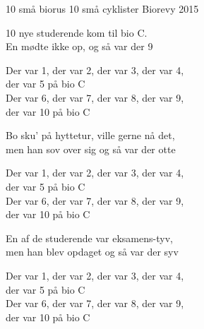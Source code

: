 \begin{song}{10 små biorus}{}
  {10 små cyklister}
  {}
  {Biorevy 2015}
  {\NotCCLIed}

  \begin{SBVerse}
  10 nye studerende kom til bio C.\\
  En mødte ikke op, og så var der 9\\
  \end{SBVerse}

  \begin{SBChorus}
  Der var 1, der var 2, der var 3, der var 4,\\
  der var 5 på bio C\\
  Der var 6, der var 7, der var 8, der var 9,\\
  der var 10 på bio C
  \end{SBChorus}

  \begin{SBVerse}
  Bo sku' på hyttetur, ville gerne nå det,\\
  men han sov over sig og så var der otte
  \end{SBVerse}

  \begin{SBChorus}
  Der var 1, der var 2, der var 3, der var 4,\\
  der var 5 på bio C\\
  Der var 6, der var 7, der var 8, der var 9,\\
  der var 10 på bio C
  \end{SBChorus}


  \begin{SBVerse}
  En af de studerende var eksamens-tyv,\\
  men han blev opdaget og så var der syv
  \end{SBVerse}

  \begin{SBChorus}
  Der var 1, der var 2, der var 3, der var 4,\\
  der var 5 på bio C\\
  Der var 6, der var 7, der var 8, der var 9,\\
  der var 10 på bio C
  \end{SBChorus}



\end{song}
